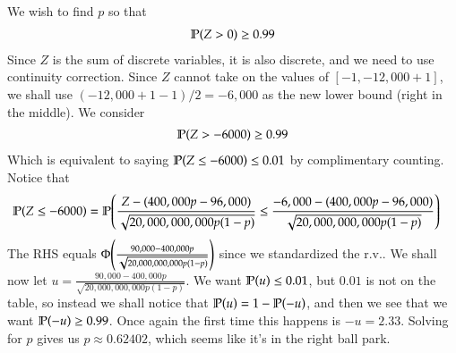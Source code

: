 \documentclass[12pt]{article}
\renewcommand{\P}{\mathbb{P}\qty}
\begin{document}
\begin{enumerate}[leftmargin=\labelsep]
\begin{enumerate}
			We wish to find $p$ so that 
			\begin{align*}
				\P(Z > 0) \geq 0.99
			\end{align*}
			Since $Z$ is the sum of discrete variables, it is also discrete, and we need to use continuity correction. Since $Z$ cannot take on the values of $[-1, -12,000+1]$, we shall use $(-12,000+1-1) / 2 = -6,000$ as the new lower bound (right in the middle). We consider
			\begin{align*}
				\P(Z > -6000) \geq 0.99
			\end{align*}
			Which is equivalent to saying $\P(Z \leq -6000) \leq 0.01$ by complimentary counting. Notice that
			\begin{align*}
				\P(Z \leq -6000) &= \P(\frac{Z - (400,000p - 96,000)}{\sqrt{20,000,000,000p(1-p)}} \leq \frac{-6,000 - (400,000p - 96,000)}{\sqrt{20,000,000,000p(1-p)}})
			\end{align*}
			The RHS equals $\Phi\qty(\frac{90,000 - 400,000p}{\sqrt{20,000,000,000p(1-p)}})$ since we standardized the r.v.. We shall now let $u = \frac{90,000 - 400,000p}{\sqrt{20,000,000,000p(1-p)}}$. We want $\P(u) \leq 0.01$, but $0.01$ is not on the table, so instead we shall notice that $\P(u) = 1 - \P(-u)$, and then we see that we want $\P(-u) \geq 0.99$. Once again the first time this happens is $-u = 2.33$. Solving for $p$ gives us $p \approx 0.62402$, which seems like it's in the right ball park.
			

\end{enumerate}
\end{enumerate}
\end{document}
